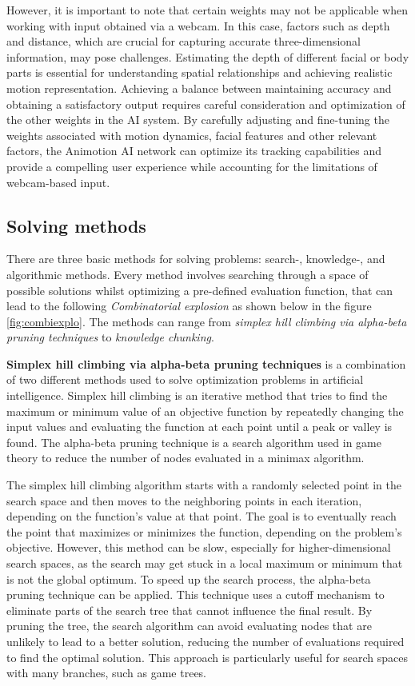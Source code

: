 However, it is important to note that certain weights may not be 
applicable when working with input obtained via a webcam. In this 
case, factors such as depth and distance, which are crucial for 
capturing accurate three-dimensional information, may pose 
challenges. Estimating the depth of different facial or 
body parts is essential for understanding spatial relationships 
and achieving realistic motion representation. Achieving a balance between maintaining accuracy and obtaining 
a satisfactory output requires careful consideration and 
optimization of the other weights in the AI system. By carefully adjusting and fine-tuning the weights associated 
with motion dynamics, facial features and other relevant factors, 
the Animotion AI network can optimize its tracking capabilities 
and provide a compelling user experience while accounting for the 
limitations of webcam-based input. \cite{weights}

\subsection{Solving methods}
There are three basic methods for solving problems: 
search-, knowledge-, and algorithmic methods. 
Every method involves searching through a space of possible
solutions whilst optimizing a pre-defined evaluation function, 
that can lead to the following \emph{Combinatorial explosion} as shown below in the figure \ref{fig:combiexplo}. 
The methods can range from \emph{simplex hill climbing via alpha-beta pruning techniques} to \emph{knowledge chunking}. 

\textbf{Simplex hill climbing via alpha-beta pruning techniques} is a combination of two different methods used to solve optimization problems 
in artificial intelligence. Simplex hill climbing is an iterative method that tries to find the maximum or minimum value of an objective function 
by repeatedly changing the input values and evaluating the function at each point until a peak or valley is found. The alpha-beta pruning 
technique is a search algorithm used in game theory to reduce the number of nodes evaluated in a minimax algorithm.

The simplex hill climbing algorithm starts with a randomly selected point in the search space and then moves to the neighboring points 
in each iteration, depending on the function's value at that point. The goal is to eventually reach the point that maximizes or minimizes 
the function, depending on the problem's objective. However, this method can be slow, especially for higher-dimensional search spaces, 
as the search may get stuck in a local maximum or minimum that is not the global optimum. To speed up the search process, the alpha-beta 
pruning technique can be applied. This technique uses a cutoff mechanism to eliminate 
parts of the search tree that cannot influence the final result. By pruning the tree, the search algorithm can avoid evaluating nodes 
that are unlikely to lead to a better solution, reducing the number of evaluations required to find the optimal solution. This approach 
is particularly useful for search spaces with many branches, such as game trees.

